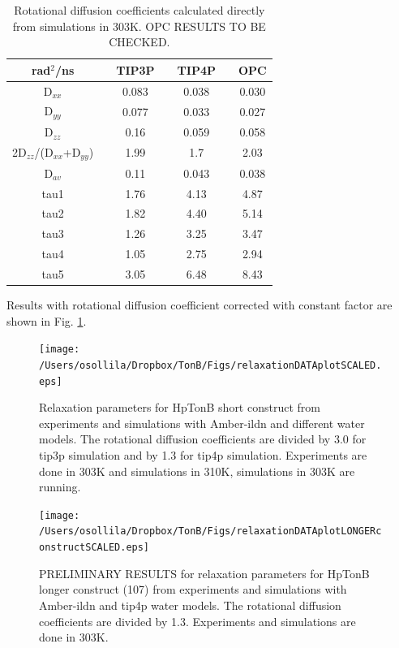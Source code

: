 \documentclass[pre,aps,floatfix,authordate1-4]{revtex4-1}
\begin{document}
\begin{table}[htb]
\centering
\caption{Rotational diffusion coefficients calculated directly from simulations in 303K.
  OPC RESULTS TO BE CHECKED.
}\label{ROTdiffCOEFFS}
\begin{tabular}{c c c c c c c }
  rad$^2$/ns   &    &  TIP3P  &   &   TIP4P   &  &   OPC \\
  \hline
  D$_{xx}$    &   &   0.083   &   &   0.038   &  &   0.030 \\
  D$_{yy}$   &    &  0.077   &    &   0.033   &  &   0.027 \\
  D$_{zz}$   &    &  0.16    &    &   0.059   &  &    0.058 \\
  2D$_{zz}$/(D$_{xx}$+D$_{yy}$) &  &   1.99    &  & 1.7    &	&  2.03 \\
  D$_{av}$  &    &   0.11    &    &   0.043   &  &   0.038 \\
  tau1     &  &  1.76	 &       &   4.13    &   &   4.87 \\
  tau2     &  &  1.82	 &       &   4.40    &   &   5.14 \\
  tau3     &  &  1.26	&        &   3.25    &   &   3.47 \\
  tau4     &  &  1.05	 &       &    2.75   &   &  2.94 \\
  tau5     &  &  3.05	 &       &    6.48   &   &   8.43 \\
  
\end{tabular}
\end{table} 

Results with rotational diffusion coefficient corrected with constant factor
are shown in Fig. \ref{relaxationDATAplotSCALED}. 
\begin{figure}[!h]
  \texttt{[image: /Users/osollila/Dropbox/TonB/Figs/relaxationDATAplotSCALED.eps]}%
  \caption{Relaxation parameters for HpTonB short construct from
    experiments and simulations with Amber-ildn and different water models.
    The rotational diffusion coefficients are divided by 3.0 for tip3p simulation
    and by 1.3 for tip4p simulation.
    Experiments are done in 303K and simulations in 310K, simulations in 303K are running.
    \label{relaxationDATAplotSCALED}}%
\end{figure}

\begin{figure}[!h]
  \texttt{[image: /Users/osollila/Dropbox/TonB/Figs/relaxationDATAplotLONGERconstructSCALED.eps]}%
  \caption{PRELIMINARY RESULTS for relaxation parameters for HpTonB longer construct (107) from
    experiments and simulations with Amber-ildn and tip4p water models.
    The rotational diffusion coefficients are divided by 1.3.
    Experiments and simulations are done in 303K.
    \label{relaxationDATAplotSCALEDlongerCONSTRUCT}}%
\end{figure}
\end{document}
